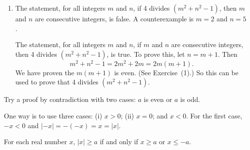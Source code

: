 \begin{list}{\bf{\ref{exer:sec34-6}.}}
\item \begin{enumerate}
\item The statement, for all integers $m$ and $n$, if 4 divides $\left(m^2 + n^2 - 1 \right)$, then $m$ and $n$ are consecutive integers, is false.  A counterexample is $m = 2$ and $n = 5$.

The statement, for all integers $m$ and $n$, if $m$ and $n$ are consecutive integers, then 4 divides $\left(m^2 + n^2 - 1 \right)$, is true.  To prove this, let $n = m + 1$.  Then
\[
m^2 + n^2 - 1 = 2m^2 + 2m = 2m(m + 1).
\]
We have proven the $m(m + 1)$ is even.  (See Exercise~(1).)  So this can be used to prove that 4 divides $\left(m^2 + n^2 - 1 \right)$.
\end{enumerate}
\end{list}



\begin{list}{\bf{\ref{exer:a2plus1not2n}.}}
\item Try a proof by contradiction with two cases:  $a$ is even or $a$ is odd.
\end{list}





\begin{list}{\bf{\ref{exer:absvalue}.}}
\item \begin{list}{\bf{(a)}}
\item  One way is to use three cases:  (i) $x > 0$; (ii) $x = 0$; and $x < 0$.  For the first case, $-x < 0$ and $\left| -x \right| = -( -x ) = x = \left| x \right|$.
\end{list}
\end{list}


\begin{list}{\bf{\ref{exer:absvaluex}.}}
\item \begin{list}{\bf{(a)}}
\item  For each real number $x$, $\left| x \right| \geq a$ if and only if $x \geq a$ or 
$x \leq -a$.
\end{list}
\end{list}
\hbreak
\renewcommand{\labelenumi}{\textbf{\arabic{enumi}.}}

\endinput
